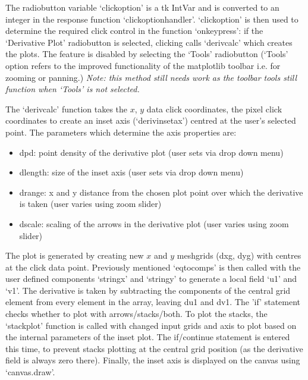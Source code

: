 \documentclass[12pt]{report}
\begin{document}
The radiobutton variable `click\textunderscore option' is a tk IntVar and is converted to an integer in the response function `click\textunderscore option\textunderscore handler'. `click\textunderscore option' is then used to determine the required click control in the function `on\textunderscore key\textunderscore press': if the `Derivative Plot' radiobutton is selected, clicking calls `deriv\textunderscore calc' which creates the plots. The feature is disabled by selecting the `Tools' radiobutton (`Tools' option refers to the improved functionality of the matplotlib toolbar i.e. for zooming or panning.) \textit{Note: this method still needs work as the toolbar tools still function when `Tools' is not selected.}

The `deriv\textunderscore calc' function takes the $x$, $y$ data click coordinates, the pixel click coordinates to create an inset axis (`deriv\textunderscore inset\textunderscore ax') centred at the user's selected point. The parameters which determine the axis properties are:
\begin{itemize}
	\item dpd: point density of the derivative plot (user sets via drop down menu)
	\item d\textunderscore length: size of the inset axis (user sets via drop down menu)
	\item d\textunderscore range: x and y distance from the chosen plot point over which the derivative is taken (user varies using zoom slider)
	\item d\textunderscore scale: scaling of the arrows in the derivative plot (user varies using zoom slider)
\end{itemize}

The plot is generated by creating new $x$ and $y$ meshgrids (dxg, dyg) with centres at the click data point. Previously mentioned `eq\textunderscore to\textunderscore comps' is then called with the user defined components `string\textunderscore x' and `string\textunderscore y' to generate a local field `u1' and `v1'. The derivative is taken by subtracting the components of the central grid element from every element in the array, leaving du1 and dv1. The 'if' statement checks whether to plot with arrows/stacks/both. To plot the stacks, the `stack\textunderscore plot' function is called with changed input grids and axis to plot based on the internal parameters of the inset plot. The if/continue statement is entered this time, to prevent stacks plotting at the central grid position (as the derivative field is always zero there). Finally, the inset axis is displayed on the canvas using `canvas.draw'. 
\end{document}
